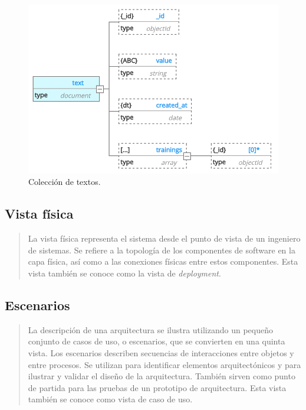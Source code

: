 \documentclass[12pt,a4paper,]{scrartcl}
\begin{document}
\begin{figure}[H]

{\centering \includegraphics{assets/developer/db-text.png} 

}

\caption{Colección de textos.}\label{fig:developer-db-text}
\end{figure}

\hypertarget{vista-fuxedsica}{%
\subsection{Vista física}\label{vista-fuxedsica}}

\begin{quote}
La vista física representa el sistema desde el punto de vista de un ingeniero de sistemas.
Se refiere a la topología de los componentes de software en la capa física, así como a las conexiones físicas entre estos componentes.
Esta vista también se conoce como la vista de \emph{deployment}.
\end{quote}

\hypertarget{escenarios}{%
\subsection{Escenarios}\label{escenarios}}

\begin{quote}
La descripción de una arquitectura se ilustra utilizando un pequeño conjunto de casos de uso, o escenarios, que se convierten en una quinta vista.
Los escenarios describen secuencias de interacciones entre objetos y entre procesos.
Se utilizan para identificar elementos arquitectónicos y para ilustrar y validar el diseño de la arquitectura.
También sirven como punto de partida para las pruebas de un prototipo de arquitectura.
Esta vista también se conoce como vista de caso de uso.
\end{quote}
\end{document}
